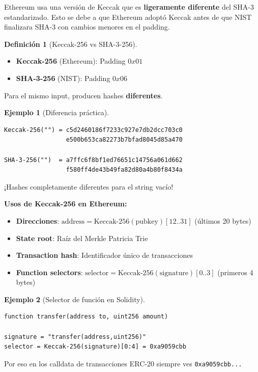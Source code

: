 \documentclass[11pt,a4paper,twoside,openright]{book}
\theoremstyle{definition}
\newtheorem{definition}{Definición}[chapter]
\newtheorem{example}{Ejemplo}[chapter]
\theoremstyle{plain}
\theoremstyle{remark}
\begin{document}
\begin{intuicion}
Ethereum usa una versión de Keccak que es \textbf{ligeramente diferente} del SHA-3 estandarizado. Esto se debe a que Ethereum adoptó Keccak antes de que NIST finalizara SHA-3 con cambios menores en el padding.
\end{intuicion}

\begin{definition}[Keccak-256 vs SHA-3-256]
\begin{itemize}
    \item \textbf{Keccak-256} (Ethereum): Padding $0x01$
    \item \textbf{SHA-3-256} (NIST): Padding $0x06$
\end{itemize}

Para el mismo input, producen hashes \textbf{diferentes}.
\end{definition}

\begin{example}[Diferencia práctica]
\begin{verbatim}
Keccak-256("") = c5d2460186f7233c927e7db2dcc703c0
                 e500b653ca82273b7bfad8045d85a470
                 
SHA-3-256("")  = a7ffc6f8bf1ed76651c14756a061d662
                 f580ff4de43b49fa82d80a4b80f8434a
\end{verbatim}

¡Hashes completamente diferentes para el string vacío!
\end{example}

\textbf{Usos de Keccak-256 en Ethereum:}
\begin{itemize}
    \item \textbf{Direcciones}: $\text{address} = \text{Keccak-256}(\text{pubkey})[12..31]$ (últimos 20 bytes)
    \item \textbf{State root}: Raíz del Merkle Patricia Trie
    \item \textbf{Transaction hash}: Identificador único de transacciones
    \item \textbf{Function selectors}: $\text{selector} = \text{Keccak-256}(\text{signature})[0..3]$ (primeros 4 bytes)
\end{itemize}

\begin{example}[Selector de función en Solidity]
\begin{verbatim}
function transfer(address to, uint256 amount)

signature = "transfer(address,uint256)"
selector = Keccak-256(signature)[0:4] = 0xa9059cbb
\end{verbatim}

Por eso en los calldata de transacciones ERC-20 siempre ves \texttt{0xa9059cbb...}
\end{example}
\end{document}
